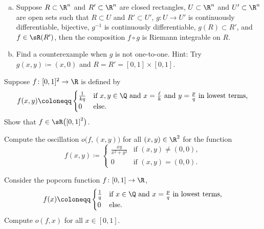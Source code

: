 \begin{exercise}
\leavevmode
\begin{enumerate}[a)]
\item
Suppose $R \subset \R^n$ and
$R' \subset \R^n$ are closed rectangles,
$U \subset \R^n$ and $U' \subset \R^n$ are open sets such that
$R \subset U$ and $R' \subset U'$,
$g \colon U \to U'$ is continuously differentiable, bijective,
$g^{-1}$ is continuously differentiable,
$g(R) \subset R'$, and
$f \in \sR(R')$, 
then the composition $f \circ g$ is Riemann integrable on $R$.
\item
Find a counterexample when $g$ is not one-to-one.
Hint: Try $g(x,y) \coloneqq (x,0)$ and $R=R'=[0,1] \times [0,1]$.
\end{enumerate}
\end{exercise}

\begin{exercise}
Suppose 
$f \colon [0,1]^2 \to \R$ is defined by
\begin{equation*}
f(x,y) \coloneqq
\begin{cases}
\frac{1}{kq} & \text{if } x,y \in \Q \text{ and } x = \frac{\ell}{k}
\text{ and } y=\frac{p}{q} \text{ in lowest terms,} \\
0            & \text{else.}
\end{cases}
\end{equation*}
Show that $f \in \sR\bigl({[0,1]}^2\bigr)$.
\end{exercise}

\begin{exercise}
Compute the oscillation $o\bigl(f,(x,y)\bigr)$ for all $(x,y) \in \R^2$
for the function
\begin{equation*}
f(x,y) \coloneqq
\begin{cases}
\frac{xy}{x^2+y^2} & \text{if } (x,y) \not= (0,0), \\
0                  & \text{if } (x,y) = (0,0) .
\end{cases}
\end{equation*}
\end{exercise}

\begin{exercise}
Consider the popcorn function $f \colon [0,1] \to \R$,
\begin{equation*}
f(x) \coloneqq
\begin{cases}
\frac{1}{q} & \text{if } x \in \Q \text{ and } x = \frac{p}{q}
 \text{ in lowest terms,} \\
0           & \text{else.}
\end{cases}
\end{equation*}
Compute $o(f,x)$ for all $x \in [0,1]$.
\end{exercise}

